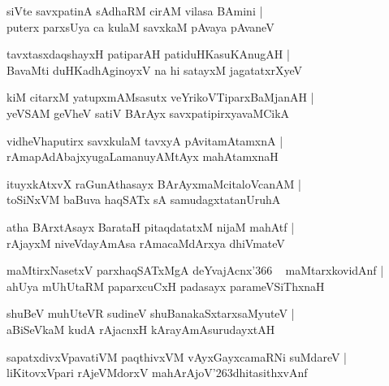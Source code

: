 \documentclass[twoside,12pt,openright]{book}
\def\S{\char'263}
\newcounter{shloka}[chapter]
\begin{document}
\begin{shloka}%
siVte savxpatinA sAdhaRM cirAM vilasa BAmini |\\
puterx parxsUya ca kulaM savxkaM pAvaya pAvaneV
\end{shloka}

\begin{shloka}%
tavxtasxdaqshayxH patiparAH patiduHKasuKAnugAH |\\
BavaMti duHKadhAginoyxV na hi satayxM jagatatxrXyeV
\end{shloka}

\begin{shloka}%
kiM citarxM yatupxmAMsasutx veYrikoVTiparxBaMjanAH |\\
yeVSAM  geVheV satiV BArAyx savxpatipirxyavaMCikA 
\end{shloka}

\begin{shloka}%
vidheVhaputirx savxkulaM tavxyA pAvitamAtamxnA |\\
rAmapAdAbajxyugaLamanuyAMtAyx mahAtamxnaH 
\end{shloka}

\begin{shloka}%
ituyxkAtxvX raGunAthasayx BArAyxmaMcitaloVcanAM |\\
toSiNxVM baBuva haqSATx sA samudagxtatanUruhA 
\end{shloka}

\begin{shloka}%
atha BArxtAsayx BarataH pitaqdatatxM nijaM mahAtf |\\
rAjayxM niveVdayAmAsa rAmacaMdArxya dhiVmateV 
\end{shloka}

\begin{shloka}%
maMtirxNasetxV parxhaqSATxMgA deYvajAcnx\char'366 ~ maMtarxkovidAnf |\\
ahUya mUhUtaRM paparxcuCxH padasayx parameVSiThxnaH 
\end{shloka}

\begin{shloka}%
shuBeV muhUteVR sudineV shuBanakaSxtarxsaMyuteV |\\
aBiSeVkaM kudA rAjacnxH kArayAmAsurudayxtAH 
\end{shloka}

\begin{shloka}%
sapatxdivxVpavatiVM paqthivxVM vAyxGayxcamaRNi suMdareV |\\
liKitovxVpari rAjeVMdorxV mahArAjoV\S dhitasithxvAnf
\end{shloka}
\end{document}
